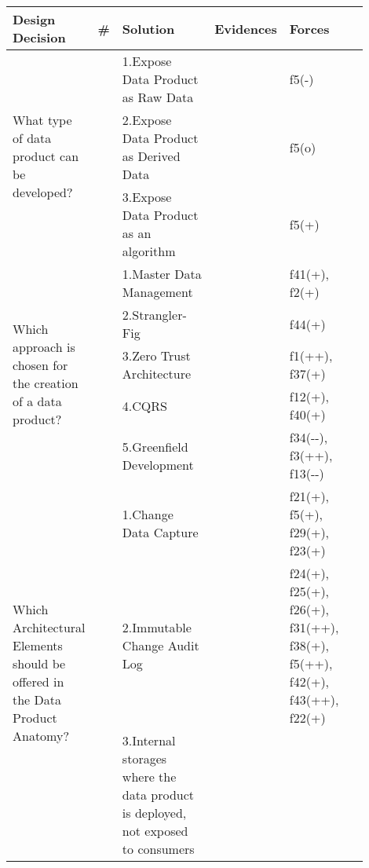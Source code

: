\begin{tabular}{|p{0.12\linewidth}|p{0.015\linewidth}|p{0.3\linewidth}|p{0.15\linewidth}|p{0.31\linewidth}|}
\hline
{\bf Design Decision} & {\bf \#} & {\bf Solution} & {\bf Evidences} & {\bf Forces}\\
\hline
\multirow{3}{\linewidth}{What type of data product can be developed?} &\cellcolor{emerald_shape_3}{} &1.Expose Data Product as Raw Data&\cellcolor{emerald_shape_7}{s1, s2, s6, s7, s9, s14, s15, s27, s34, s43} & f5(-)\\
 & \cellcolor{emerald_shape_3}{} & 2.Expose Data Product as Derived Data&\cellcolor{emerald_shape_7}{s1, s2, s6, s9, s14, s15, s27, s34} & f5(o)\\
 & \multirow{-3}{\linewidth}{ \cellcolor{emerald_shape_3}{10}} &3.Expose Data Product as an algorithm&\cellcolor{emerald_shape_4}{s2, s6} & f5(+)\\
\multirow{5}{\linewidth}{Which approach is chosen for the creation of a data product?} &\cellcolor{emerald_shape_6}{} &1.Master Data Management&\cellcolor{emerald_shape_3}{s7, s9, s23, s44, s48, s56} & f41(+), f2(+)\\
 & \cellcolor{emerald_shape_6}{} & 2.Strangler-Fig&\cellcolor{emerald_shape_2}{s56, s57} & f44(+)\\
 & \cellcolor{emerald_shape_6}{} & 3.Zero Trust Architecture&\cellcolor{emerald_shape_2}{s45, s56} & f1(++), f37(+)\\
 & \cellcolor{emerald_shape_6}{} & 4.CQRS&\cellcolor{emerald_shape_3}{s8, s38, s39, s41, s43, s56} & f12(+), f40(+)\\
 & \multirow{-5}{\linewidth}{ \cellcolor{emerald_shape_6}{34}} &5.Greenfield Development&\cellcolor{emerald_shape_7}{s1, s2, s3, s5, s6, s7, s8, s9, s11, s14, s15, s18, s20, s23, s25, s28, s30, s31, s32, s33, s35, s37, s38, s39, s40, s41, s42, s43, s45, s49} & f34(-{}-), f3(++), f13(-{}-)\\
\multirow{7}{\linewidth}{Which Architectural Elements should be offered in the Data Product Anatomy?} &\cellcolor{emerald_shape_6}{} &1.Change Data Capture&\cellcolor{emerald_shape_4}{s4, s17, s20, s38, s45, s48, s53, s54, s55, s56} & f21(+), f5(+), f29(+), f23(+)\\
 & \cellcolor{emerald_shape_6}{} & 2.Immutable Change Audit Log&\cellcolor{emerald_shape_5}{s4, s8, s12, s31, s32, s35, s36, s45, s47, s48, s53, s54, s55, s56, s57} & f24(+), f25(+), f26(+), f31(++), f38(+), f5(++), f42(+), f43(++), f22(+)\\
 & \cellcolor{emerald_shape_6}{} & 3.Internal storages where the data product is deployed, not exposed to consumers&\cellcolor{emerald_shape_3}{s4, s13, s15, s32, s33, s36, s49} & \\

\end{tabular}

